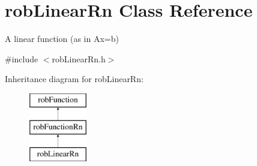 \hypertarget{classrob_linear_rn}{\section{rob\-Linear\-Rn Class Reference}
\label{classrob_linear_rn}
}


A linear function (as in Ax=b)  




{\ttfamily \#include $<$rob\-Linear\-Rn.\-h$>$}

Inheritance diagram for rob\-Linear\-Rn\-:\begin{figure}[H]
\begin{center}
\leavevmode
\includegraphics[height=3.000000cm]{da/d3b/classrob_linear_rn}
\end{center}
\end{figure}
